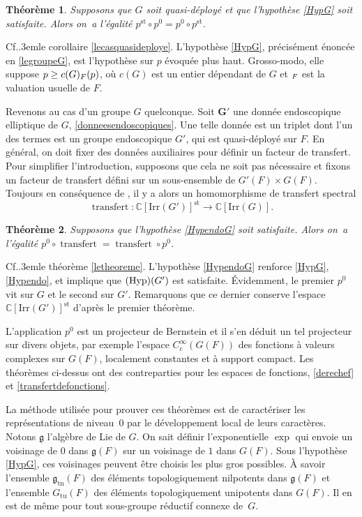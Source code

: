 \documentclass[JEP,XML,SOM,Unicode,francais]{cedram}
\newcommand{\NoChangel}[1]{%
\expandafter\let\csname old\string#1\endcsname=#1
\let#1=\relax
\newcommand{#1}{\mathcode`l="716C\csname old\string#1\endcsname\mathcode`l="7160 }%
}
\newcommand\Cf{Cf.\kern.3em}
\newcommand{\frg}{\mathfrak{g}}
\newcommand{\rc}{\mathrm{c}}
\newcommand{\Hyp}{\textup{Hyp}}
\newcommand{\Irr}{\mathrm{Irr}}
\newcommand{\st}{\mathrm{st}}
\newcommand{\tn}{\mathrm{tn}}
\newcommand{\tu}{\mathrm{tu}}
\DeclareMathOperator{\transfert}{transfert}
\DeclareMathOperator{\val}{val} \NoChangel{\val}
\newcommand{\bG}{\boldsymbol{G}}
\newcommand{\CC}{\mathbb{C}}
\theoremstyle{plain}
\newtheorem{thm}{Théorème}
\theoremstyle{definition}
\begin{document}
\begin{thm}\label{th:1}
Supposons que $G$ soit quasi-déployé et que l'hypothèse \ref{HypG} soit satisfaite. Alors on~a l'égalité $p^{\st}\circ p^0=p^0\circ p^{\st}$.
\end{thm}

\Cf le corollaire \ref{lecasquasideploye}. L'hypothèse \ref{HypG}, précisément énoncée en \ref{legroupeG}, est l'hypothèse sur $p$ évoquée plus haut. Grosso-modo, elle suppose $p\geq c(G)\val_{F}(p)$, où $c(G)$ est un entier dépendant de $G$ et $\val_{F}$ est la valuation usuelle de $F$.

Revenons au cas d'un groupe $G$ quelconque. Soit $\bG'$ une donnée endoscopique elliptique de $G$, \cf \ref{donneesendoscopiques}. Une telle donnée est un triplet dont l'un des termes est un groupe endoscopique $G'$, qui est quasi-déployé sur $F$. En général, on doit fixer des données auxiliaires pour définir un facteur de transfert. Pour simplifier l'introduction, supposons que cela ne soit pas nécessaire et fixons un facteur de transfert défini sur un sous-ensemble de $G'(F)\times G(F)$. Toujours en conséquence de \cite{A3}, il y a alors un homomorphisme de transfert spectral
\[
\transfert:\CC[\Irr(G')]^{\st}\to \CC[\Irr(G)].
\]

\begin{thm}\label{th:2}
Supposons que l'hypothèse \ref{HypendoG} soit satisfaite. Alors on~a l'égalité $p^0\circ \transfert=\transfert\circ p^0$.
\end{thm}

\Cf le théorème \ref{letheoreme}. L'hypothèse \ref{HypendoG} renforce \ref{HypG}, \cf \ref{Hypendo}, et implique que $(\Hyp)(G')$ est satisfaite. Évidemment, le premier $p^0$ vit sur $G$ et le second sur $G'$. Remarquons que ce dernier conserve l'espace $\CC[\Irr(G')]^{\st}$ d'après le premier théorème.

L'application $p^0$ est un projecteur de Bernstein et il s'en déduit un tel projecteur sur divers objets, par exemple l'espace $C_{\rc}^{\infty}(G(F))$ des fonctions à valeurs complexes sur $G(F)$, localement constantes et à support compact. Les théorèmes ci-dessus ont des contreparties pour les espaces de fonctions, \cf \ref{derechef} et \ref{transfertdefonctions}.

La méthode utilisée pour prouver ces théorèmes est de caractériser les représentations de niveau~$0$ par le développement local de leurs caractères. Notons $\frg$ l'algèbre de Lie de $G$. On sait définir l'exponentielle $\exp$ qui envoie un voisinage de $0$ dans $\frg(F)$ sur un voisinage de $1$ dans $G(F)$. Sous l'hypothèse \ref{HypG}, ces voisinages peuvent être choisis les plus gros possibles. À savoir l'ensemble $\frg_{\tn}(F)$ des éléments topologiquement nilpotents dans $\frg(F)$ et l'ensemble $G_{\tu}(F)$ des éléments topologiquement unipotents dans $G(F)$. Il en est de même pour tout sous-groupe réductif connexe de~$G$.
\end{document}
